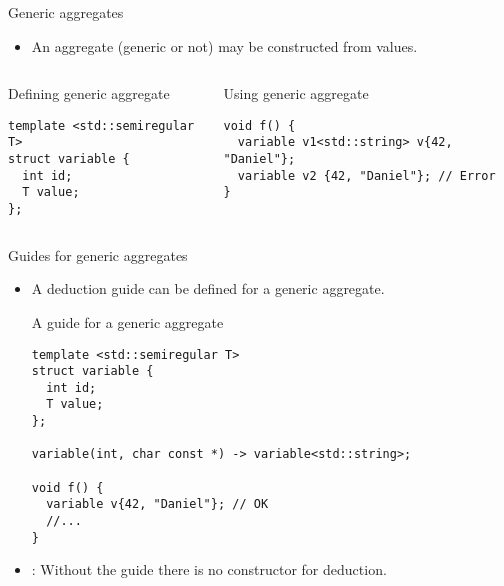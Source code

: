 \begin{frame}[t,fragile]{Generic aggregates}
\begin{itemize}
  \item An aggregate (generic or not) may be constructed from values.
\end{itemize}

\begin{columns}[T]

\begin{block}{Defining generic aggregate}
\begin{lstlisting}
template <std::semiregular T>
struct variable {
  int id;
  T value;
};
\end{lstlisting}
\end{block}

\begin{block}{Using generic aggregate}
\begin{lstlisting}
void f() {
  variable v1<std::string> v{42, "Daniel"};
  variable v2 {42, "Daniel"}; // Error
}
\end{lstlisting}
\end{block}

\end{columns}

\end{frame}

\begin{frame}[t,fragile,shrink=10]{Guides for generic aggregates}
\begin{itemize}
  \item A deduction guide can be defined for a generic aggregate.

\begin{block}{A guide for a generic aggregate}
\begin{lstlisting}
template <std::semiregular T>
struct variable {
  int id;
  T value;
};

variable(int, char const *) -> variable<std::string>;

void f() {
  variable v{42, "Daniel"}; // OK
  //...
}
\end{lstlisting}
\end{block}


  \item {}: Without the guide there is no constructor for deduction.

\end{itemize}
\end{frame}
